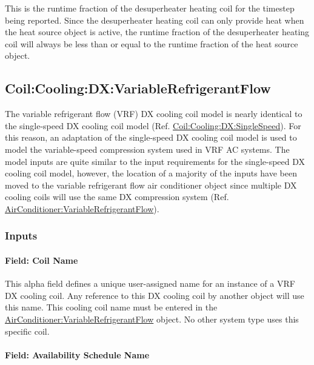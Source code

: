 This is the runtime fraction of the desuperheater heating coil for the timestep being reported. Since the desuperheater heating coil can only provide heat when the heat source object is active, the runtime fraction of the desuperheater heating coil will always be less than or equal to the runtime fraction of the heat source object.

\subsection{Coil:Cooling:DX:VariableRefrigerantFlow}\label{coilcoolingdxvariablerefrigerantflow}

The variable refrigerant flow (VRF) DX cooling coil model is nearly identical to the single-speed DX cooling coil model (Ref. \hyperref[coilcoolingdxsinglespeed]{Coil:Cooling:DX:SingleSpeed}). For this reason, an adaptation of the single-speed DX cooling coil model is used to model the variable-speed compression system used in VRF AC systems. The model inputs are quite similar to the input requirements for the single-speed DX cooling coil model, however, the location of a majority of the inputs have been moved to the variable refrigerant flow air conditioner object since multiple DX cooling coils will use the same DX compression system (Ref. \hyperref[airconditionervariablerefrigerantflow]{AirConditioner:VariableRefrigerantFlow}).

\subsubsection{Inputs}\label{inputs-6-010}

\paragraph{Field: Coil Name}\label{field-coil-name-000}

This alpha field defines a unique user-assigned name for an instance of a VRF DX cooling coil. Any reference to this DX cooling coil by another object will use this name. This cooling coil name must be entered in the \hyperref[airconditionervariablerefrigerantflow]{AirConditioner:VariableRefrigerantFlow} object. No other system type uses this specific coil.

\paragraph{Field: Availability Schedule Name}\label{field-availability-schedule-name-1-007}

